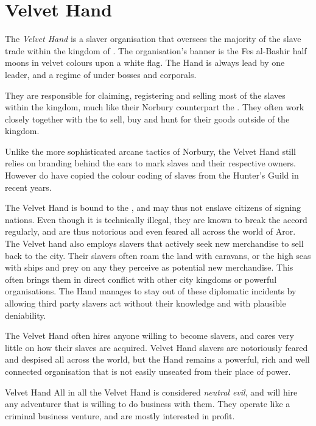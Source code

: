\section{Velvet Hand}
\label{sec:Velvet Hand}

The \emph{Velvet Hand} is a slaver organisation that oversees the majority of
the slave trade within the kingdom of . The
organisation's banner is the Fes al-Bashir half moons in velvet colours upon a
white flag. The Hand is always lead by one leader, and a regime of under
bosses and corporals.

They are responsible for claiming, registering and selling most of the slaves
within the kingdom, much like their Norbury counterpart the
. They often work closely together with the
 to sell, buy and hunt for their
goods outside of the kingdom.

Unlike the more sophisticated arcane tactics of Norbury, the Velvet Hand still
relies on branding behind the ears to mark slaves and their respective
owners. However do have copied the colour coding of slaves from the Hunter's
Guild in recent years.

The Velvet Hand is bound to the , and may thus not
enslave citizens of signing nations. Even though it is technically illegal,
they are known to break the accord regularly, and are thus notorious and even
feared all across the world of Aror. The Velvet hand also employs slavers that
actively seek new merchandise to sell back to the city. Their slavers often
roam the land with caravans, or the high seas with ships and prey on any they
perceive as potential new merchandise. This often brings them in direct
conflict with other city kingdoms or powerful organisations. The Hand manages
to stay out of these diplomatic incidents by allowing third party slavers act
without their knowledge and with plausible deniability.

The Velvet Hand often hires anyone willing to become slavers, and cares very
little on how their slaves are acquired. Velvet Hand slavers are notoriously
feared and despised all across the world, but the Hand remains a powerful,
rich and well connected organisation that is not easily unseated from their
place of power.

\begin{35e}{Velvet Hand}
  All in all the Velvet Hand is considered \emph{neutral evil}, and will hire
  any adventurer that is willing to do business with them. They operate like
  a criminal business venture, and are mostly interested in profit.
\end{35e}
